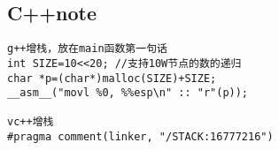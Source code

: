 \subsection{C++note}
\begin{verbatim}
g++增栈，放在main函数第一句话
int SIZE=10<<20; //支持10W节点的数的递归
char *p=(char*)malloc(SIZE)+SIZE;
__asm__("movl %0, %%esp\n" :: "r"(p));

vc++增栈
#pragma comment(linker, "/STACK:16777216")
\end{verbatim}
